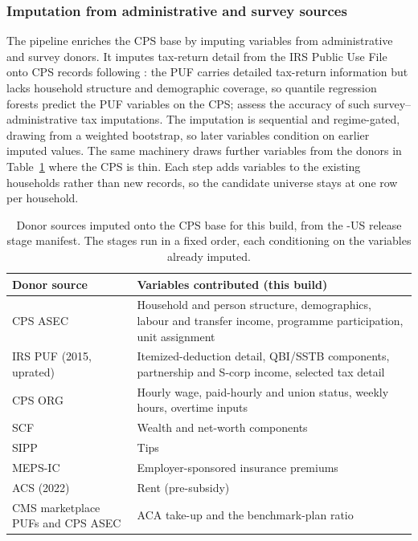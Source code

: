 \subsubsection{Imputation from administrative and survey sources}

The pipeline enriches the CPS base by imputing variables from administrative and survey donors. It
imputes tax-return detail from the IRS Public Use File \citep[PUF;][]{bryant2023a} onto CPS records
following \citet{woodruff2024}: the PUF carries detailed tax-return information but lacks household
structure and demographic coverage, so quantile regression forests \citep{meinshausen2006quantile}
predict the PUF variables on the CPS; \citet{meyer2021} assess the accuracy of such
survey--administrative tax imputations. The imputation is sequential and regime-gated, drawing from a
weighted bootstrap, so later variables condition on earlier imputed values. The same machinery draws
further variables from the donors in Table~\ref{tab:donors} where the CPS is thin. Each step adds
variables to the existing households rather than new records, so the candidate universe stays at one
row per household.

\begin{table}[H]
\centering
{\tablefont
\begin{tabular}{@{}p{}p{}@{}}
\toprule
Donor source & Variables contributed (this build) \\
\midrule
CPS ASEC & Household and person structure, demographics, labour and transfer income, programme participation, unit assignment \\
IRS PUF (2015, uprated) & Itemized-deduction detail, QBI/SSTB components, partnership and S-corp income, selected tax detail \\
CPS ORG & Hourly wage, paid-hourly and union status, weekly hours, overtime inputs \\
SCF & Wealth and net-worth components \\
SIPP & Tips \\
MEPS-IC & Employer-sponsored insurance premiums \\
ACS (2022) & Rent (pre-subsidy) \\
CMS marketplace PUFs and CPS ASEC & ACA take-up and the benchmark-plan ratio \\
\bottomrule
\end{tabular}
}
\caption{Donor sources imputed onto the CPS base for this build, from the \microcosm{}-US release stage
manifest. The stages run in a fixed order, each conditioning on the variables already imputed.}
\label{tab:donors}
\end{table}

